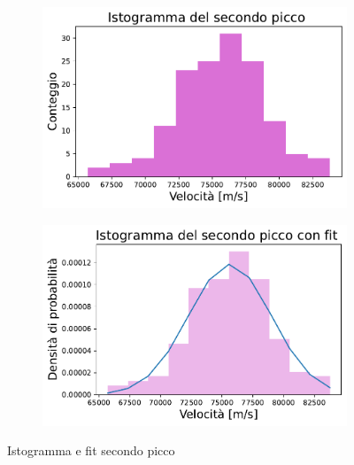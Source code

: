 \begin{figure}[H]
\centering

\begin{subfigure}[h!]{0.49\textwidth}
	\includegraphics[width=\textwidth]{Secondo_histo.pdf}
    \label{fig:sub1}
\end{subfigure}
\hfill
\begin{subfigure}[h!]{0.49\textwidth}
    \includegraphics[width=\textwidth]{Secondo_histo_fit.pdf}
    \label{fig:sub2}
\end{subfigure}
\caption{Istogramma e fit secondo picco}
\end{figure}

